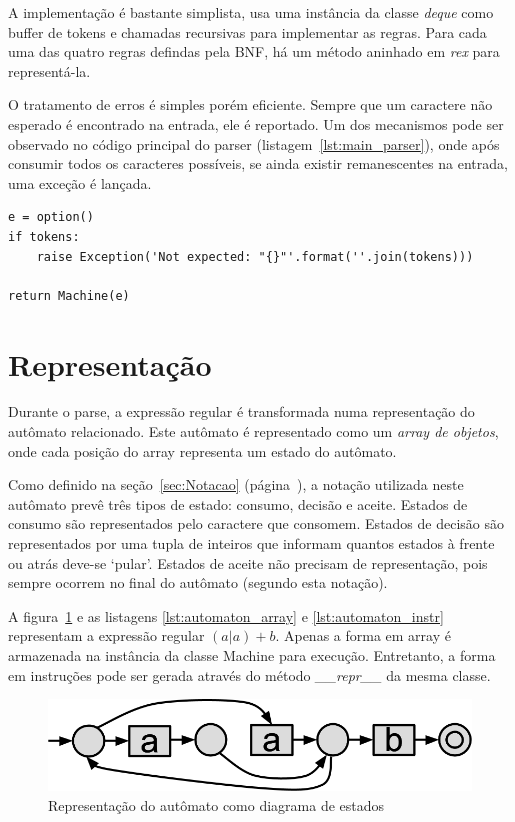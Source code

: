 \documentclass[a4paper,12pt,oneside,onecolumn]{uerj}
\begin{document}
A implementação é bastante simplista, usa uma instância da classe \emph{deque} como buffer de tokens e chamadas recursivas para implementar as regras. Para cada uma das quatro regras defindas pela BNF, há um método aninhado em \emph{rex} para representá-la.

O tratamento de erros é simples porém eficiente. Sempre que um caractere não esperado é encontrado na entrada, ele é reportado. Um dos mecanismos pode ser observado no código principal do parser (listagem~\ref{lst:main_parser}), onde após consumir todos os caracteres possíveis, se ainda existir remanescentes na entrada, uma exceção é lançada.

\vspace{0.5cm}
\begin{lstlisting}[caption={Exemplo de tratamento de erros no parser},label=lst:main_parser]
e = option()
if tokens: 
    raise Exception('Not expected: "{}"'.format(''.join(tokens)))

return Machine(e)
\end{lstlisting}

\section{Representação}

Durante o parse, a expressão regular é transformada numa representação do autômato relacionado. Este autômato é representado como um \emph{array de objetos}, onde cada posição do array representa um estado do autômato.

Como definido na seção~\ref{sec:Notacao} (página~\pageref{sec:Notacao}), a notação utilizada neste autômato prevê três tipos de estado: consumo, decisão e aceite. Estados de consumo são representados pelo caractere que consomem. Estados de decisão são representados por uma tupla de inteiros que informam quantos estados à frente ou atrás deve-se `pular'. Estados de aceite não precisam de representação, pois sempre ocorrem no final do autômato (segundo esta notação).

A figura~\ref{fig:exemplo_automato_puro} e as listagens \ref{lst:automaton_array} e \ref{lst:automaton_instr} representam a expressão regular $(a|a)+b$. Apenas a forma em array é armazenada na instância da classe Machine para execução. Entretanto, a forma em instruções pode ser gerada através do método \emph{\_\_repr\_\_} da mesma classe.

\begin{figure}[ht]
  \centering
  \includegraphics[scale=0.4]{figures/exemplo_automato_puro.png}
  \caption{Representação do autômato como diagrama de estados}
  \label{fig:exemplo_automato_puro}
\end{figure}
\end{document}
